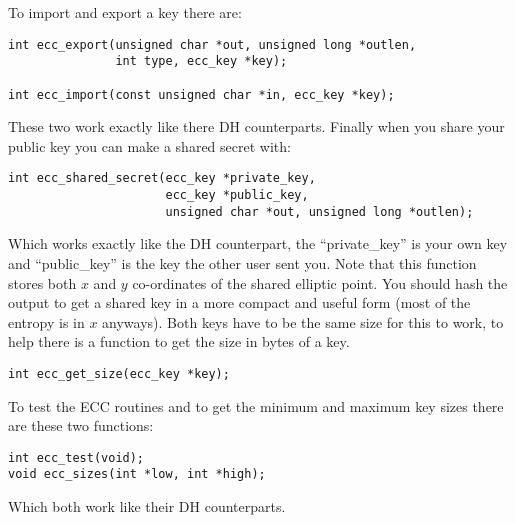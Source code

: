 \documentclass{book}
\begin{document}
To import and export a key there are: 
\begin{verbatim}
int ecc_export(unsigned char *out, unsigned long *outlen, 
               int type, ecc_key *key);

int ecc_import(const unsigned char *in, ecc_key *key);
\end{verbatim}
These two work exactly like there DH counterparts.  Finally when you share your public key you can make a shared secret
with:
\begin{verbatim}
int ecc_shared_secret(ecc_key *private_key, 
                      ecc_key *public_key, 
                      unsigned char *out, unsigned long *outlen);
\end{verbatim}
Which works exactly like the DH counterpart, the ``private\_key'' is your own key and ``public\_key'' is the key the other
user sent you.   Note that this function stores both $x$ and $y$ co-ordinates of the shared
elliptic point.  You should hash the output to get a shared key in a more compact and useful form (most of the entropy is 
in $x$ anyways).  Both keys have to be the same size for this to work, to help there is a function to get the size in bytes
 of a key.
\begin{verbatim}
int ecc_get_size(ecc_key *key);
\end{verbatim}

To test the ECC routines and to get the minimum and maximum key sizes there are these two functions:
\begin{verbatim}
int ecc_test(void);
void ecc_sizes(int *low, int *high);
\end{verbatim}
Which both work like their DH counterparts.
\end{document}
